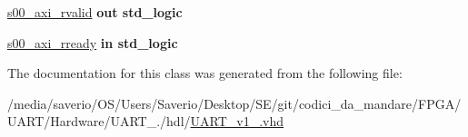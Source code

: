 \begin{DoxyCompactItemize}
\item 
\mbox{\label{classUART__v1__0_af180911f7eb262e530e26865bc97aa0b}} 
\hyperlink{classUART__v1__0_af180911f7eb262e530e26865bc97aa0b}{s00\+\_\+axi\+\_\+rvalid}  {\bfseries {\bfseries \textcolor{vhdlchar}{out}\textcolor{vhdlchar}{ }}} {\bfseries \textcolor{vhdlchar}{std\+\_\+logic}\textcolor{vhdlchar}{ }} 
\item 
\mbox{\label{classUART__v1__0_a8b82eb165d7024f6c7b25646f6ebdd4d}} 
\hyperlink{classUART__v1__0_a8b82eb165d7024f6c7b25646f6ebdd4d}{s00\+\_\+axi\+\_\+rready}  {\bfseries {\bfseries \textcolor{vhdlchar}{in}\textcolor{vhdlchar}{ }}} {\bfseries \textcolor{vhdlchar}{std\+\_\+logic}\textcolor{vhdlchar}{ }} 
\end{DoxyCompactItemize}


The documentation for this class was generated from the following file\+:\begin{DoxyCompactItemize}
\item 
/media/saverio/\+O\+S/\+Users/\+Saverio/\+Desktop/\+S\+E/git/codici\+\_\+da\+\_\+mandare/\+F\+P\+G\+A/\+U\+A\+R\+T/\+Hardware/\+U\+A\+R\+T\+\_./hdl/\hyperlink{UART__v1__0_8vhd}{U\+A\+R\+T\+\_\+v1\+\_.\+vhd}\end{DoxyCompactItemize}
